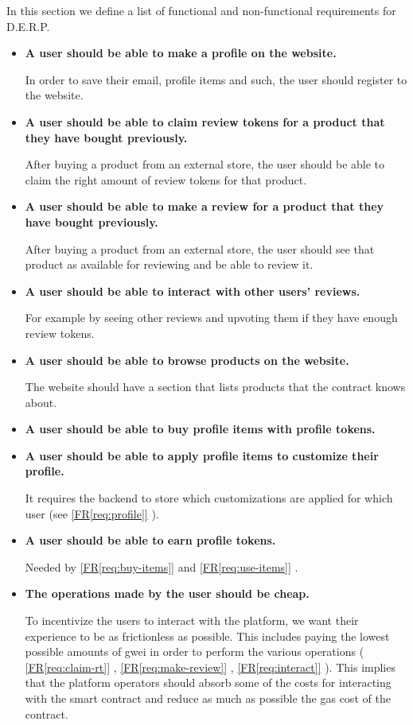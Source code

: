 \documentclass[12pt,a4paper,oneside]{article}
\theoremstyle{definition}
\newcounter{freqcounter}
\newcommand{\req}[1]{%
	\textbf{FR\ref*{#1}}\refstepcounter{freqcounter}\label{#1}%
}
\newcommand{\reqref}[1]{%
	\hyperref[#1]{[FR\ref*{#1}]}%
}
\newcounter{nfreqcounter}
\newcommand{\nreq}[1]{%
	\textbf{NFR\ref*{#1}}\refstepcounter{nfreqcounter}\label{#1}%
}
\newcommand{\ReqItemStyle}[1]{\textbf{#1}}
\newcommand{\ReqItem}[2]{\item[\req{#1}] \ReqItemStyle{#2}}
\newcommand{\NReqItem}[2]{\item[\nreq{#1}] \ReqItemStyle{#2}}
\begin{document}
In this section we define a list of functional and non-functional requirements for D.E.R.P.

\begin{itemize}
	\ReqItem{req:profile}{A user should be able to make a profile on the website.}

	In order to save their email, profile items and such, the user should register to the website.

	\ReqItem{req:claim-rt}{A user should be able to claim review tokens for a product that they have bought previously.}

	After buying a product from an external store, the user should be able to claim the right amount of review tokens for that product.

	\ReqItem{req:make-review}{A user should be able to make a review for a product that they have bought previously.}

	After buying a product from an external store, the user should see that product as available for reviewing and be able to review it.

	\ReqItem{req:interact}{A user should be able to interact with other users' reviews.}

	For example by seeing other reviews and upvoting them if they have enough review tokens.

	\ReqItem{req:browse-products}{A user should be able to browse products on the website.}

	The website should have a section that lists products that the contract knows about.

	\ReqItem{req:buy-items}{A user should be able to buy profile items with profile tokens.}

	\ReqItem{req:use-items}{A user should be able to apply profile items to customize their profile.}

	It requires the backend to store which customizations are applied for which user (see \reqref{req:profile}).

	\ReqItem{req:earn-pt}{A user should be able to earn profile tokens.}

	Needed by \reqref{req:buy-items} and \reqref{req:use-items}.

	\NReqItem{nreq:low-cost}{The operations made by the user should be cheap.}

	To incentivize the users to interact with the platform, we want their experience to be as frictionless as possible. This includes paying the lowest possible amounts of gwei in order to perform the various operations (\reqref{req:claim-rt}, \reqref{req:make-review}, \reqref{req:interact}).
	This implies that the platform operators should absorb some of the costs for interacting with the smart contract and reduce as much as possible the gas cost of the contract.


\end{itemize}
\end{document}
